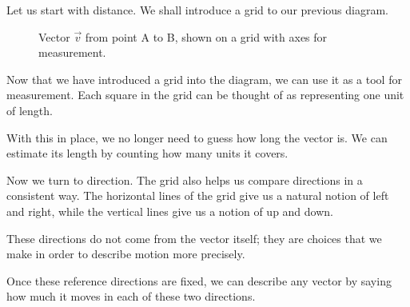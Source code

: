 \documentclass[11pt,openany]{book}
\theoremstyle{definition}
\begin{document}
\medskip

Let us start with distance. We shall introduce a grid to our previous diagram.

\begin{figure}[H]
\centering
{}
\caption{Vector $\vec{v}$ from point A to B, shown on a grid with axes for measurement.}
\end{figure}

Now that we have introduced a grid into the diagram, we can use it as a tool for measurement. 
Each square in the grid can be thought of as representing one unit of length.

\medskip

With this in place, we no longer need to guess how long the vector is. 
We can estimate its length by counting how many units it covers.

\medskip

Now we turn to direction. The grid also helps us compare directions in a consistent way. 
The horizontal lines of the grid give us a natural notion of left and right, while the vertical lines give us a notion of up and down.

\medskip

These directions do not come from the vector itself; they are choices that we make in order to describe motion more precisely.

\medskip

Once these reference directions are fixed, we can describe any vector by saying how much it moves in each of these two directions.
\end{document}
